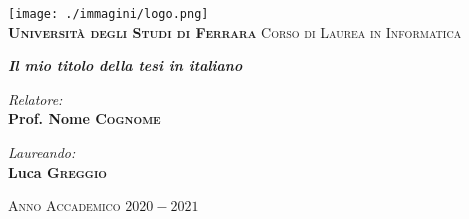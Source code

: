 \documentclass[a4paper, 12pt]{book}
\begin{document}

\begin{titlepage}
	\centering
	\vspace*{20mm}
	\texttt{[image: ./immagini/logo.png]}\\
	\vspace*{1cm}
	\huge \textbf{\textsc{Università degli Studi di Ferrara}}
	\Large \textsc{Corso di Laurea in Informatica}
	
	\vspace*{1.5cm}
	\vspace*{10mm}
	\Huge \emph{\textbf{Il mio titolo della tesi in italiano}}
	\vspace*{10mm}
	
	\vspace*{15mm}
	\begin{minipage}{0.45\textwidth}
		\begin{flushleft} \Large
			\emph{Relatore:}\\
			\Large \textbf{Prof. Nome \textsc{Cognome}}
		\end{flushleft}
	\end{minipage}
	\begin{minipage}{0.45\textwidth}
		\begin{flushright} \Large
			\emph{Laureando:} \\
			\Large \textbf{Luca \textsc{Greggio}}
		\end{flushright}
	\end{minipage}
	
	\vspace*{20mm}
	\Large \textsc{Anno Accademico $2020-2021$}
\end{titlepage}
\restoregeometry

\pagestyle{empty}
\clearpage
\tableofcontents
\thispagestyle{empty}
\end{document}
